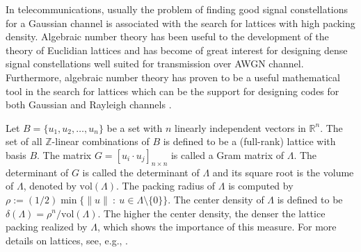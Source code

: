 \documentclass{amsart}
\begin{document}
In telecommunications, usually the problem of finding good signal constellations for a Gaussian channel is associated with the search for lattices with high packing density. Algebraic number theory has been useful to the development of the theory of Euclidian lattices and has become of great interest for designing dense signal constellations well suited for transmission over AWGN channel. Furthermore, algebraic number theory has proven to be a useful mathematical tool in the search for lattices which can be the support for designing codes for both Gaussian and Rayleigh channels \cite{andrade-1,oggier-1,boutros,bottcher,oggier-2}.

Let $B=\{u_1,u_2,\ldots,u_n\}$ be a set with $n$ linearly independent vectors in $\mathbb{R}^n$. The set of all $\mathbb{Z}$-linear combinations of $B$ is defined to be a (full-rank) lattice with basis $B$. The matrix $G=\left[u_i\cdot u_j\right]_{n\times n}$ is called a Gram matrix of $\Lambda$. The determinant of $G$ is called the determinant of $\Lambda$ and its square root is the volume of $\Lambda$, denoted by $\textrm{vol}(\Lambda)$. The packing radius of $\Lambda$ is computed by $\rho:=(1/2)\min\{\|u\|~:~u\in\Lambda\setminus\{0\}\}$. The center density of $\Lambda$ is defined to be $\delta(\Lambda)=\rho^n/\textrm{vol}(\Lambda)$. The higher the center density, the denser the lattice packing realized by $\Lambda$, which shows the importance of this measure. For more details on lattices, see, e.g., \cite{costa,sloane}.


\end{document}
